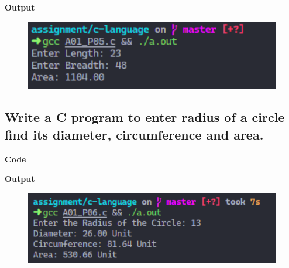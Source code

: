 \documentclass[a4paper]{article}
\begin{document}


\textbf{Output}

\begin{figure}[h]
  \includegraphics[width=12cm]{A01_P05}
\end{figure}

\newpage



\subsection{Write a C program to enter radius of a circle find its diameter, circumference and area.}
\textbf{Code}



\textbf{Output}

\begin{figure}[h]
  \includegraphics[width=12cm]{A01_P06}
\end{figure}

\newpage

\end{document}

